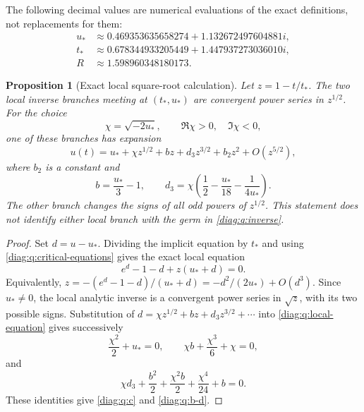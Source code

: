 \documentclass[11pt,a4paper]{article}
\newtheorem{proposition}[theorem]{Proposition}
\theoremstyle{definition}
\theoremstyle{remark}
\numberwithin{equation}{section}
\begin{document}
The following decimal values are numerical evaluations of the exact
definitions, not replacements for them:
\begin{align*}
 u_*&\approx0.469353635658274+1.132672497604881i,\\
 t_*&\approx0.678344933205449+1.447937273036010i,\\
 R&\approx1.598960348180173.
\end{align*}

\begin{proposition}[Exact local square-root calculation]
\label{diag:q:local}
Let $z=1-t/t_*$.  The two local inverse branches meeting at $(t_*,u_*)$
are convergent power series in $z^{1/2}$.  For the choice
\begin{equation}\label{diag:q:c}
 \chi=\sqrt{-2u_*},\qquad \Re \chi>0,\quad\Im \chi<0,
\end{equation}
one of these branches has expansion
\begin{equation}\label{diag:q:puiseux}
 u(t)=u_*+\chi z^{1/2}+b z+d_3 z^{3/2}+b_2z^2+O(z^{5/2}),
\end{equation}
where $b_2$ is a constant and
\begin{equation}\label{diag:q:b-d}
 b=\frac{u_*}{3}-1,\qquad
 d_3=\chi\left(\frac12-\frac{u_*}{18}-\frac1{4u_*}\right).
\end{equation}
The other branch changes the signs of all odd powers of $z^{1/2}$.
This statement does not identify either local branch with the germ in
\eqref{diag:q:inverse}.
\end{proposition}

\begin{proof}
Set $d=u-u_*$.  Dividing the implicit equation by $t_*$ and using
\eqref{diag:q:critical-equations} gives the exact local equation
\begin{equation}\label{diag:q:local-equation}
 e^d-1-d+z(u_*+d)=0.
\end{equation}
Equivalently,
$z=-(e^d-1-d)/(u_*+d)=-d^2/(2u_*)+O(d^3)$.
Since $u_*\neq0$, the local analytic inverse is a convergent power series
in $\sqrt z$, with its two possible signs.  Substitution of
$d=\chi z^{1/2}+b z+d_3z^{3/2}+\cdots$ into
\eqref{diag:q:local-equation} gives successively
\[
 \frac{\chi^2}{2}+u_*=0,\qquad
 \chi b+\frac{\chi^3}{6}+\chi=0,
\]
and
\[
 \chi d_3+\frac{b^2}{2}+\frac{\chi^2b}{2}+\frac{\chi^4}{24}+b=0.
\]
These identities give \eqref{diag:q:c} and \eqref{diag:q:b-d}.
\end{proof}
\end{document}
